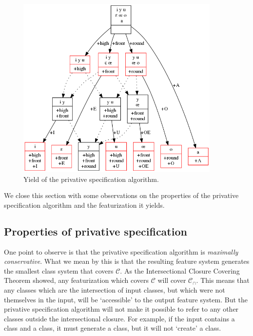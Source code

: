 \documentclass[11pt, oneside]{article}   	%
\begin{document}
\begin{figure}[htb!]
  \centering
  \includegraphics[width=0.9\textwidth]{vowel_inventory_privative.png}
  \caption{Yield of the privative specification algorithm.}
  \label{fig:privative}
\end{figure}

We close this section with some observations on the properties of the privative specification algorithm and the featurization it yields. 

\subsection{Properties of privative specification}
\label{sec:priv_props}

One point to observe is that the privative specification algorithm is \textit{maximally conservative}. What we mean by this is that the resulting feature system generates the smallest class system that covers $\mathcal C$. As the Intersectional Closure Covering Theorem showed, any featurization which covers $\mathcal C$ will cover $\mathcal C_\cap$. This means that any classes which are the intersection of input classes, but which were not themselves in the input, will be `accessible' to the output feature system. But the privative specification algorithm will not make it possible to refer to any other classes outside the intersectional closure. For example, if the input contains a  class and a  class, it must generate a  class, but it will not `create' a  class.
\end{document}
